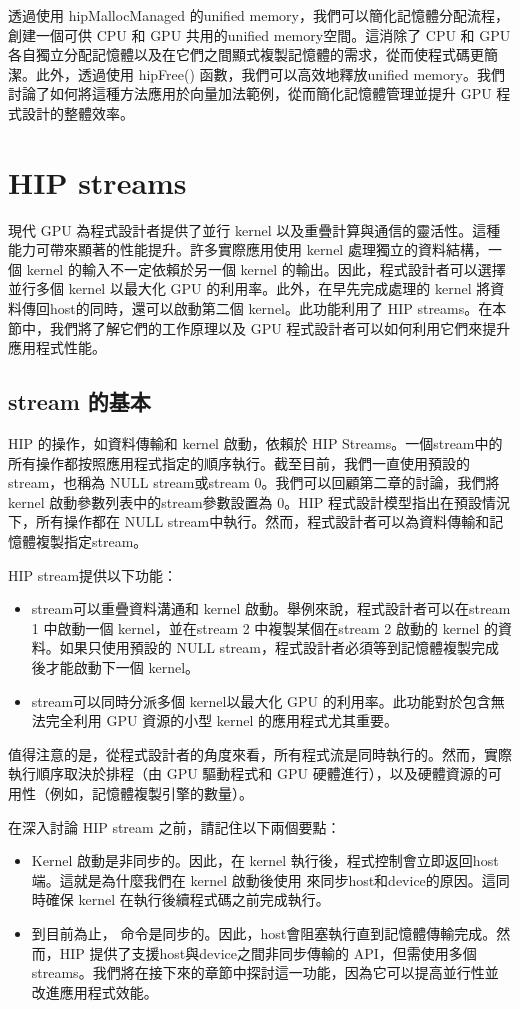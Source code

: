 透過使用 hipMallocManaged 的unified memory，我們可以簡化記憶體分配流程，創建一個可供 CPU 和 GPU 共用的unified memory空間。這消除了 CPU 和 GPU 各自獨立分配記憶體以及在它們之間顯式複製記憶體的需求，從而使程式碼更簡潔。此外，透過使用 hipFree() 函數，我們可以高效地釋放unified memory。我們討論了如何將這種方法應用於向量加法範例，從而簡化記憶體管理並提升 GPU 程式設計的整體效率。

\section{HIP streams}

現代 GPU 為程式設計者提供了並行 kernel 以及重疊計算與通信的靈活性。這種能力可帶來顯著的性能提升。許多實際應用使用 kernel 處理獨立的資料結構，一個 kernel 的輸入不一定依賴於另一個 kernel 的輸出。因此，程式設計者可以選擇並行多個 kernel 以最大化 GPU 的利用率。此外，在早先完成處理的 kernel 將資料傳回host的同時，還可以啟動第二個 kernel。此功能利用了 HIP streams。在本節中，我們將了解它們的工作原理以及 GPU 程式設計者可以如何利用它們來提升應用程式性能。

\subsection{stream 的基本}
HIP 的操作，如資料傳輸和 kernel 啟動，依賴於 HIP Streams。一個stream中的所有操作都按照應用程式指定的順序執行。截至目前，我們一直使用預設的stream，也稱為 NULL stream或stream 0。我們可以回顧第二章的討論，我們將 kernel 啟動參數列表中的stream參數設置為 0。HIP 程式設計模型指出在預設情況下，所有操作都在 NULL stream中執行。然而，程式設計者可以為資料傳輸和記憶體複製指定stream。

HIP stream提供以下功能：
\begin{itemize}
    \item stream可以重疊資料溝通和 kernel 啟動。舉例來說，程式設計者可以在stream 1 中啟動一個 kernel，並在stream 2 中複製某個在stream 2 啟動的 kernel 的資料。如果只使用預設的 NULL stream，程式設計者必須等到記憶體複製完成後才能啟動下一個 kernel。
    \item stream可以同時分派多個 kernel以最大化 GPU 的利用率。此功能對於包含無法完全利用 GPU 資源的小型 kernel 的應用程式尤其重要。
\end{itemize}

值得注意的是，從程式設計者的角度來看，所有程式流是同時執行的。然而，實際執行順序取決於排程（由 GPU 驅動程式和 GPU 硬體進行），以及硬體資源的可用性（例如，記憶體複製引擎的數量）。

在深入討論 HIP stream 之前，請記住以下兩個要點：
\begin{itemize}
    \item Kernel 啟動是非同步的。因此，在 kernel 執行後，程式控制會立即返回host端。這就是為什麼我們在 kernel 啟動後使用  來同步host和device的原因。這同時確保 kernel 在執行後續程式碼之前完成執行。
    \item 到目前為止， 命令是同步的。因此，host會阻塞執行直到記憶體傳輸完成。然而，HIP 提供了支援host與device之間非同步傳輸的 API，但需使用多個streams。我們將在接下來的章節中探討這一功能，因為它可以提高並行性並改進應用程式效能。
\end{itemize}

